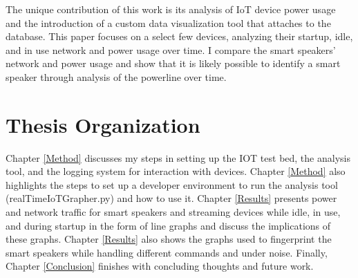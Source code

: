 The unique contribution of this work is its analysis of IoT device power usage and the introduction of a custom data visualization tool that attaches to the database. This paper focuses on a select few devices, analyzing their startup, idle, and in use network and power usage over time. I compare the smart speakers' network and power usage and show that it is likely possible to identify a smart speaker through analysis of the powerline over time.

\section{Thesis Organization}
Chapter \ref{Method} discusses my steps in setting up the IOT test bed, the analysis tool, and the logging system for interaction with devices. Chapter \ref{Method} also highlights the steps to set up a developer environment to run the analysis tool (realTimeIoTGrapher.py) and how to use it. Chapter \ref{Results} presents power and network traffic for smart speakers and streaming devices while idle, in use, and during startup in the form of line graphs and discuss the implications of these graphs. Chapter \ref{Results} also shows the graphs used to fingerprint the smart speakers while handling different commands and under noise. Finally, Chapter \ref{Conclusion} finishes with concluding thoughts and future work.

